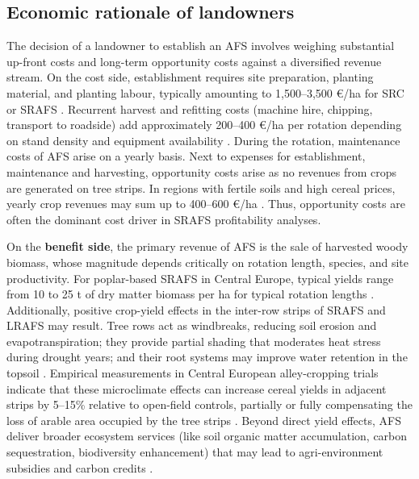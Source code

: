 \documentclass[preprint,review,1p,authoryear]{elsarticle} %
\newcommand{\euro}{€}
\begin{document}
\subsection{Economic rationale of landowners}\label{economic-rationale-of-landowners}

The decision of a landowner to establish an AFS involves weighing
substantial up-front costs and long-term opportunity costs against a
diversified revenue stream. On the cost side, establishment requires
site preparation, planting material, and planting labour, typically
amounting to 1,500--3,500 \euro/ha for SRC or SRAFS
\citep{Faasch2012_SRC_Economics, Testa2014_Poplar_Economics}. Recurrent
harvest and refitting costs (machine hire, chipping, transport to
roadside) add approximately 200--400 \euro/ha per rotation depending on
stand density and equipment availability \citep{Testa2014_Poplar_Economics, Spinelli2009_SRC_Harvesting}. During the rotation, maintenance costs of
AFS arise on a yearly basis. Next to expenses for establishment,
maintenance and harvesting, opportunity costs arise as no revenues from
crops are generated on tree strips. In regions with fertile soils and
high cereal prices, yearly crop revenues may sum up to 400--600 \euro/ha
\citep{Faasch2012_SRC_Economics, Graves2007_Agroforestry_Economics}. Thus,
opportunity costs are often the dominant cost driver in SRAFS
profitability analyses.

On the \textbf{benefit side}, the primary revenue of AFS is the sale of
harvested woody biomass, whose magnitude depends critically on rotation
length, species, and site productivity. For poplar-based SRAFS in
Central Europe, typical yields range from 10 to 25 t of dry matter
biomass per ha for typical rotation lengths \citep{Huber2018_SRAFS_growth, Niemczyk2021_Poplar_Rotation}. Additionally, positive crop-yield
effects in the inter-row strips of SRAFS and LRAFS may result. Tree rows
act as windbreaks, reducing soil erosion and evapotranspiration; they
provide partial shading that moderates heat stress during drought years;
and their root systems may improve water retention in the topsoil
\citep{Graves2007_Agroforestry_Economics, Grunewald2007_Robinia_AFS}.
Empirical measurements in Central European alley-cropping trials
indicate that these microclimate effects can increase cereal yields in
adjacent strips by 5--15\% relative to open-field controls, partially or
fully compensating the loss of arable area occupied by the tree strips
\citep{Graves2007_Agroforestry_Economics}. Beyond direct yield effects, AFS
deliver broader ecosystem services (like soil organic matter
accumulation, carbon sequestration, biodiversity enhancement) that may
lead to agri-environment subsidies and carbon credits
\citep{Toensmeier2017_Carbon_Agroforestry, Faasch2012_SRC_Economics}.
\end{document}
